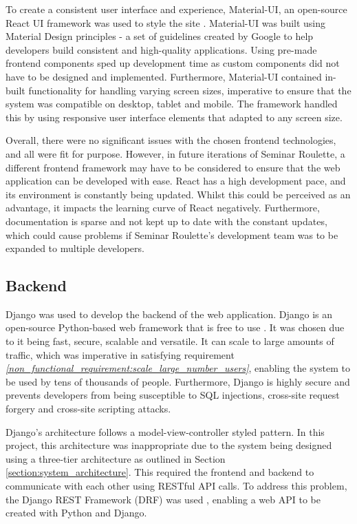 \documentclass{l4proj}
\begin{document}
To create a consistent user interface and experience, Material-UI, an open-source React UI framework was used to style the site \citep{material-ui}. Material-UI was built using Material Design principles \citep{materialdesign} - a set of guidelines created by Google to help developers build consistent and high-quality applications. Using pre-made frontend components sped up development time as custom components did not have to be designed and implemented. Furthermore, Material-UI contained in-built functionality for handling varying screen sizes, imperative to ensure that the system was compatible on desktop, tablet and mobile. The framework handled this by using responsive user interface elements that adapted to any screen size.

Overall, there were no significant issues with the chosen frontend technologies, and all were fit for purpose. However, in future iterations of Seminar Roulette, a different frontend framework may have to be considered to ensure that the web application can be developed with ease. React has a high development pace, and its environment is constantly being updated. Whilst this could be perceived as an advantage, it impacts the learning curve of React negatively. Furthermore, documentation is sparse and not kept up to date with the constant updates, which could cause problems if Seminar Roulette's development team was to be expanded to multiple developers.

\subsection{Backend}

Django was used to develop the backend of the web application. Django is an open-source Python-based web framework that is free to use \citep{django}. It was chosen due to it being fast, secure, scalable and versatile. It can scale to large amounts of traffic, which was imperative in satisfying requirement \emph{\ref{non_functional_requirement:scale_large_number_users}}, enabling the system to be used by tens of thousands of people. Furthermore, Django is highly secure and prevents developers from being susceptible to SQL injections, cross-site request forgery and cross-site scripting attacks. 

Django's architecture follows a model-view-controller styled pattern. In this project, this architecture was inappropriate due to the system being designed using a three-tier architecture as outlined in Section \ref{section:system_architecture}. This required the frontend and backend to communicate with each other using RESTful API calls. To address this problem, the Django REST Framework (DRF) was used \citep{djangorestframework}, enabling a web API to be created with Python and Django.
\end{document}
